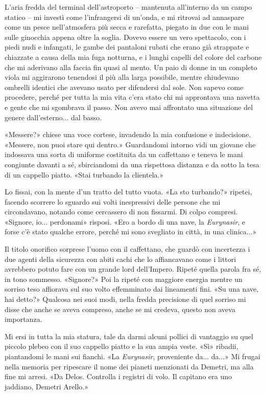 L'aria fredda del terminal dell'astroporto -- mantenuta all'interno da
un campo statico -- mi investì come l'infrangersi di un'onda, e mi
ritrovai ad annaspare come un pesce nell'atmosfera più secca e
rarefatta, piegato in due con le mani sulle ginocchia appena oltre la
soglia. Dovevo essere un vero spettacolo, con i piedi nudi e infangati,
le gambe dei pantaloni rubati che erano già strappate e chiazzate a
causa della mia fuga notturna, e i lunghi capelli del colore del carbone
che mi aderivano alla faccia fin quasi al mento. Un paio di donne in un
completo viola mi aggirarono tenendosi il più alla larga possibile,
mentre chiudevano ombrelli identici che avevano usato per difendersi dal
sole. Non sapevo come procedere, perché per tutta la mia vita c'era
stato chi mi approntava una navetta e gente che mi sgombrava il passo.
Non avevo mai affrontato una situazione del genere dall'esterno... dal
basso.

«Messere?» chiese una voce cortese, invadendo la mia confusione e
indecisione. «Messere, non puoi stare qui dentro.» Guardandomi intorno
vidi un giovane che indossava una sorta di uniforme costituita da un
caffettano e teneva le mani congiunte davanti a sé, sbirciandomi da una
rispettosa distanza e da sotto la tesa di un cappello piatto. «Stai
turbando la clientela.»

Lo fissai, con la mente d'un tratto del tutto vuota. «La sto turbando?»
ripetei, facendo scorrere lo sguardo sui volti inespressivi delle
persone che mi circondavano, notando come cercassero di non fissarmi. Di
colpo compresi. «Signore, io... perdonami» risposi. «Ero a bordo di una
nave, la \emph{Eurynasir}, e forse c'è stato qualche errore, perché mi
sono svegliato in città, in una clinica...»

Il titolo onorifico sorprese l'uomo con il caffettano, che guardò con
incertezza i due agenti della sicurezza con abiti cachi che lo
affiancavano come i littori avrebbero potuto fare con un grande lord
dell'Impero. Ripeté quella parola fra sé, in tono sommesso. «Signore?»
Poi la ripeté con maggiore energia mentre un sorriso teso affiorava sul
suo volto effemminato dai lineamenti fini. «Su una nave, hai detto?»
Qualcosa nei suoi modi, nella fredda precisione di quel sorriso mi disse
che anche se aveva compreso, anche se mi credeva, questo non aveva
importanza.

Mi ersi in tutta la mia statura, tale da darmi alcuni pollici di
vantaggio su quel piccolo plebeo con il suo cappello piatto e la sua
ampia veste. «Sì» ribadii, piantandomi le mani sui fianchi. «La
\emph{Eurynasir}, proveniente da... da...» Mi frugai nella memoria per
ripescare il nome dei pianeti menzionati da Demetri, ma alla fine mi
arresi. «Da Delos. Controlla i registri di volo. Il capitano era uno
jaddiano, Demetri Arello.»

